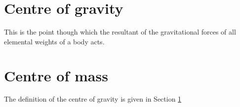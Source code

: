\documentclass[11pt,a4paper]{article}
\begin{document}
    \section{Centre of gravity}\label{sec:cg}
    This is the point though which the resultant
    of the gravitational forces of all elemental
    weights of a body acts.
%
    \section{Centre of mass}\label{sec-ex}
    The definition of the centre of gravity is
    given in Section \ref{sec:cg}
\end{document}
